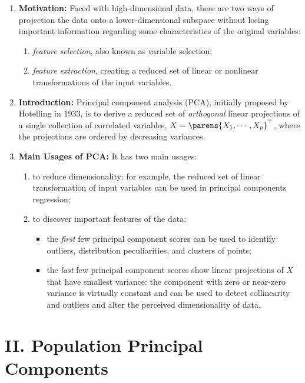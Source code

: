 \documentclass[12pt]{article}
\begin{document}
\begin{enumerate}[label=\textbf{\arabic*.}]

	\item \textbf{Motivation:} Faced with high-dimensional data, there are two ways of projection the data onto a lower-dimensional subspace without losing important information regarding some characteristics of the original variables: 
	\begin{enumerate}
		\item \textit{feature selection}, also known as variable selection; 
		\item \textit{feature extraction}, creating a reduced set of linear or nonlinear transformations of the input variables. 
	\end{enumerate}
	
	\item \textbf{Introduction:} Principal component analysis (PCA), initially proposed by Hotelling in 1933, is to derive a reduced set of \textit{orthogonal} linear projections of a single collection of correlated variables, $X = \parens{X_1, \cdots, X_p}^\top$, where the projections are ordered by decreasing variances. 
	
	\item \textbf{Main Usages of PCA:} It has two main usages: 
	\begin{enumerate}
		\item to reduce dimensionality: for example, the reduced set of linear transformation of input variables can be used in principal components regression; 
		\item to discover important features of the data: 
		\begin{itemize}
			\item the \emph{first} few principal component scores can be used to identify outliers, distribution peculiarities, and clusters of points; 
			\item the \emph{last} few principal component scores show linear projections of $X$ that have smallest variance: the component with zero or near-zero variance is virtually constant and can be used to detect collinearity and outliers and alter the perceived dimensionality of data. 
		\end{itemize}
	\end{enumerate}

\end{enumerate}


\section*{II. Population Principal Components}	
\end{document}
